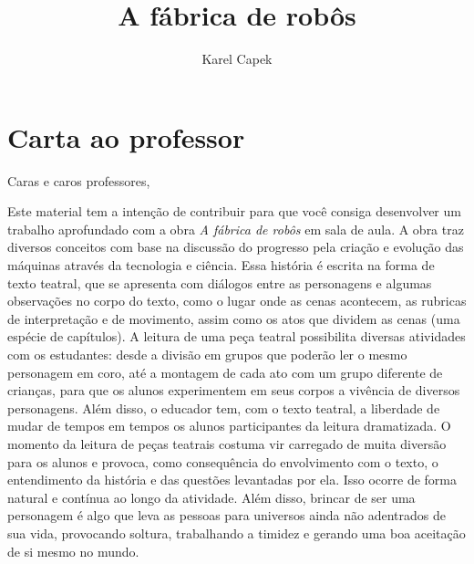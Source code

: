 \documentclass[11pt]{extarticle}
\newcommand{\AutorLivro}{Karel Capek}
\newcommand{\TituloLivro}{A fábrica de robôs}
\newcommand{\colaborador}{Gabriela Karam}
\begin{document}
\title{\TituloLivro}
\author{\AutorLivro}
\def\authornotes{\colaborador}

\date{}
\maketitle


\tableofcontents

\section{Carta ao professor}

Caras e caros professores,

Este material tem a intenção de contribuir para que você consiga desenvolver um trabalho aprofundado com a obra \textit{A fábrica de robôs} em sala de aula. A obra traz diversos conceitos com base na discussão do progresso pela criação e evolução das máquinas através da tecnologia e ciência. Essa história é escrita na forma de texto teatral, que se apresenta com diálogos entre as personagens e algumas observações no corpo do texto, como o lugar onde as cenas acontecem, as rubricas de interpretação e de movimento, assim como os atos que dividem as cenas (uma espécie de capítulos). A leitura de uma peça teatral possibilita diversas atividades com os estudantes: desde a divisão em grupos que poderão ler o mesmo personagem em coro, até a montagem de cada ato com um grupo diferente de crianças, para que os alunos experimentem em seus corpos a vivência de diversos personagens. Além disso, o educador tem, com o texto teatral, a liberdade de mudar de tempos em tempos os alunos participantes da leitura dramatizada. O momento da leitura de peças teatrais costuma vir carregado de muita diversão para os alunos e provoca, como consequência do envolvimento com o texto, o entendimento da história e das questões levantadas por ela. Isso ocorre de forma natural e contínua ao longo da atividade. Além disso, brincar de ser uma personagem é algo que leva as pessoas para universos ainda não adentrados de sua vida, provocando soltura, trabalhando a timidez e gerando uma boa aceitação de si mesmo no mundo.
\end{document}
